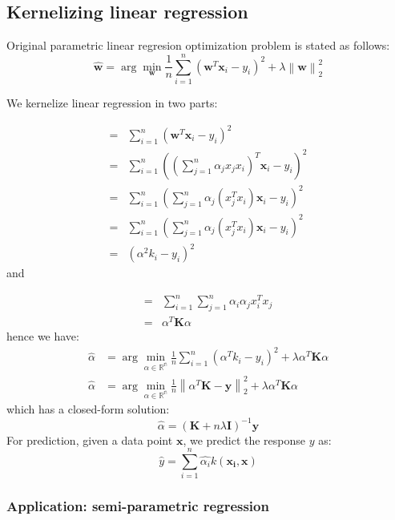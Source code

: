 \documentclass[a4paper,10pt,twoside]{article}
\newcommand\norm[1]{\left\lVert#1\right\rVert}
\begin{document}
\subsection{Kernelizing linear regression}

Original parametric linear regresion optimization problem is stated as follows:
\begin{equation*}
    \hat{\mathbf{w}}=\arg\min_{\mathbf{w}}\frac{1}{n}\sum_{i=1}^{n}(\mathbf{w}^T\mathbf{x}_i-y_i)^2+\lambda\norm{\mathbf{w}}_2^2
\end{equation*}

We kernelize linear regression in two parts:

\begin{align*}
    =& \sum_{i=1}^{n}(\mathbf{w}^T\mathbf{x}_i-y_i)^2\\
    =& \sum_{i=1}^{n}((\sum_{j=1}^{n}\alpha_jx_jx_i)^T\mathbf{x}_i-y_i)^2\\
    =& \sum_{i=1}^{n}(\sum_{j=1}^{n}\alpha_j(x_j^Tx_i)\mathbf{x}_i-y_i)^2\\
    =& \sum_{i=1}^{n}(\sum_{j=1}^{n}\alpha_j(x_j^Tx_i)\mathbf{x}_i-y_i)^2\\
    =& (\alpha^2k_i-y_i)^2
\end{align*}
and

\begin{align*}
    =& \sum_{i=1}^{n}\sum_{j=1}^{n}\alpha_i\alpha_jx_i^Tx_j\\
    =& \alpha^T\mathbf{K}\alpha
\end{align*}
hence we have:
\begin{align*}
    \hat{\alpha}&=\arg\min_{\alpha\in\mathbb{R^n}}\frac{1}{n}\sum_{i=1}^{n}(\alpha^Tk_i-y_i)^2+\lambda\alpha^T\mathbf{K}\alpha\\
    \hat{\alpha}&=\arg\min_{\alpha\in\mathbb{R^n}}\frac{1}{n}\norm{\alpha^T\mathbf{K}-\mathbf{y}}_2^2+\lambda\alpha^T\mathbf{K}\alpha
\end{align*}
which has a closed-form solution:
\begin{equation*}
    \hat{\alpha}=(\mathbf{K}+n\lambda \mathbf{I})^{-1}\mathbf{y}
\end{equation*}
For prediction, given a data point $\mathbf{x}$, we predict the response $y$ as:
\begin{equation*}
    \hat{y}=\sum_{i=1}^{n}\hat{\alpha_i}k(\mathbf{x_i},\mathbf{x})
\end{equation*}

\subsubsection{Application: semi-parametric regression}
\end{document}
